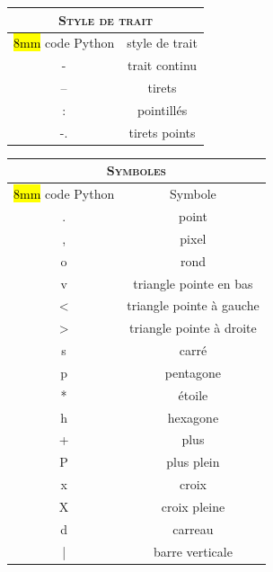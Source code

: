 \begin{minipage}[t][][b]{0.4\textwidth}
\begin{center}
\bigskip
\begin{tabular}[t]{|c|c|}
\multicolumn{2}{c}{\textsc{Style de trait}} \\
\hline
\rowcolor{lightgray}\hl{8mm} code Python & style de trait \\
\hline
- & trait continu \\
\hline
-- & tirets \\
\hline
: & pointillés \\
\hline
-. & tirets points \\
\hline
\end{tabular}
\end{center}
\end{minipage}\begin{minipage}[t][][b]{0.4\textwidth}
\begin{center}
\begin{tabular}[t]{|c|c|}
 \multicolumn{2}{c}{\textsc{Symboles}} \\
 \hline
\rowcolor{lightgray}\hl{8mm} code Python & Symbole \\
\hline
. & point \\
\hline
, & pixel \\
\hline
o & rond \\
\hline
v & triangle pointe en bas \\
\hline
< & triangle pointe à gauche \\
\hline
> & triangle pointe à droite \\
\hline
s & carré \\
\hline
p & pentagone \\
\hline
* & étoile \\
\hline
h & hexagone \\
\hline
+ & plus \\
\hline
P & plus plein \\
\hline
x & croix \\
\hline
X & croix pleine \\
\hline
d & carreau \\
\hline
| & barre verticale \\
\hline
\end{tabular}
\end{center}
\end{minipage}






